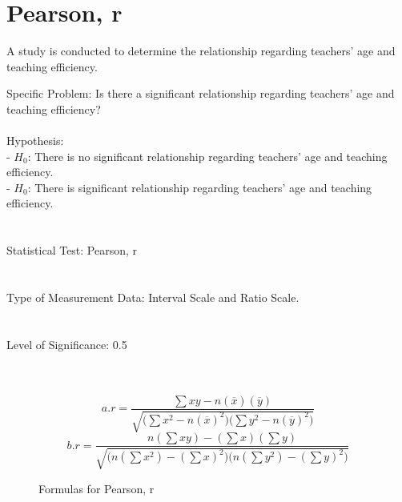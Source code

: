 \documentclass{article}
\begin{document}
    \section*{Pearson, r}
    \begin{center}
        A study is conducted to determine the relationship regarding teachers' age and teaching efficiency.
    \end{center} 
    Specific Problem: Is there a significant relationship regarding teachers' age and teaching efficiency?\\\\
    Hypothesis: \\
    -\hspace{1cm} $H_0$: There is no significant relationship regarding teachers' age and teaching efficiency.\\
    -\hspace{1cm} $H_0$: There is significant relationship regarding teachers' age and teaching efficiency.\\\\\\
    Statistical Test: Pearson, r\\\\\\
    Type of Measurement Data: Interval Scale and Ratio Scale.\\\\\\
    Level of Significance: 0.5\\\\\\
    \begin{figure*}[ht!]
        \begin{equation}
            a. r=\frac{\sum xy-n(\overline{x})(\overline{y})}{\sqrt{\bigl(\sum x^2-n(\overline{x})^2\bigr)\bigl(\sum y^2-n(\overline{y})^2\bigr)}}
        \end{equation}
        \begin{equation}
            b. r=\frac{n(\sum xy)-(\sum x)(\sum y)}{\sqrt{\bigl(n(\sum x^2)-(\sum x)^2\bigr)\bigl(n(\sum y^2)-(\sum y)^2\bigr)}}
        \end{equation}
        \caption{Formulas for Pearson, r}
    \end{figure*}
    \newpage
\end{document}
